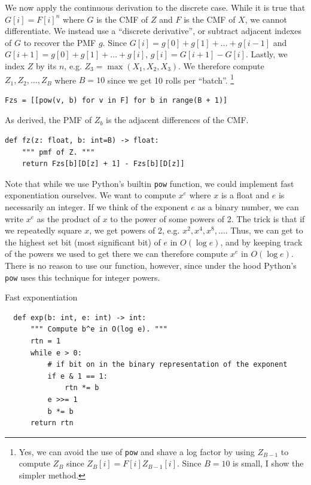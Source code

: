 \documentclass[11pt, oneside]{article}
\theoremstyle{plain}
\theoremstyle{definition}
\begin{document}
We now apply the continuous derivation to the discrete case. While it
is true that \( G[i] = F[i]^n \) where \( G \) is the CMF of \( Z \)
and \( F \) is the CMF of \( X \), we cannot differentiate. We instead
use a \enquote{discrete derivative}, or subtract adjacent indexes of \(
G \) to recover the PMF \( g \). Since \( G[i] = g[0] + g[1] + \dots +
g[i - 1] \) and \( G[i + 1] = g[0] + g[1] + \dots + g[i] \), \( g[i] =
G[i + 1] - G[i] \). Lastly, we index \( Z \) by its \( n \), e.g. \(
Z_3 = \max(X_1, X_2, X_3) \). We therefore compute \( Z_1, Z_2, \dots,
Z_B \) where \( B = 10 \) since we get 10 rolls per \enquote{batch}.
\footnote{Yes, we can avoid the use of \texttt{pow} and shave a log factor
by using \( Z_{B - 1} \) to compute \( Z_B \) since \( Z_B[i] = F[i] Z_{B
- 1} [i] \). Since \( B = 10 \) is small, I show the simpler method.}
\begin{verbatim}
Fzs = [[pow(v, b) for v in F] for b in range(B + 1)]
\end{verbatim}

As derived, the PMF of \( Z_b \) is the adjacent differences of the CMF. 
\begin{verbatim}
def fz(z: float, b: int=B) -> float:
    """ pmf of Z. """
    return Fzs[b][D[z] + 1] - Fzs[b][D[z]]
\end{verbatim}

Note that while we use Python's builtin \texttt{pow} function, we could
implement fast exponentiation ourselves. We want to compute \( x^e \) where
\( x \) is a float and \( e \) is necessarily an integer. If we think of
the exponent \( e \) as a binary number, we can write \( x^e \) as the
product of \( x \) to the power of some powers of 2. The trick is that if
we repeatedly square \( x \), we get powers of 2, e.g. \( x^2, x^4, x^8,
\dots \). Thus, we can get to the highest set bit (most significant bit)
of \( e \) in \( O(\log e) \), and by keeping track of the powers we used
to get there we can therefore compute \( x^e \) in \( O(\log e) \). There
is no reason to use our function, however, since under the hood Python's
\texttt{pow} uses this technique for integer powers.
\begin{algorithm}[H]
  \caption{Fast exponentiation}
  \label{alg:exp}
  \setlength{\partopsep}{-\topsep} %
  \begin{verbatim}
  def exp(b: int, e: int) -> int:
      """ Compute b^e in O(log e). """
      rtn = 1
      while e > 0:
          # if bit on in the binary representation of the exponent
          if e & 1 == 1:
              rtn *= b
          e >>= 1
          b *= b
      return rtn
  \end{verbatim}
\end{algorithm}
\end{document}
